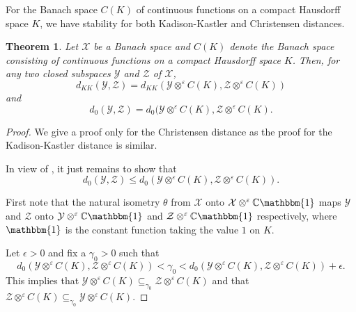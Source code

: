 \documentclass{amsart}
\numberwithin{equation}{section}
\newcommand{\mcal}{\mathcal}
\newcommand{\1}{\mathbf{1}}
\newtheorem{theorem}{Theorem}[section]
\begin{document}
For the Banach space $C(K)$ of continuous functions on a compact Hausdorff space
 $K$, we have stability for both Kadison-Kastler and Christensen distances.

\begin{theorem}\label{equality}
Let $\mcal{X}$ be a Banach space and $C(K)$ denote the Banach space
consisting of continuous functions on a compact Hausdorff space
$K$. Then, for any two closed subspaces $\mcal{Y}$ and $\mcal{Z}$ of
$\mcal{X}$,
\[
d_{KK}(\mcal{Y}, \mcal{Z})= d_{KK}(\mcal{Y}\otimes^{\varepsilon} C(K),
\mcal{Z}\otimes^{\varepsilon} C(K))
\]
and      
\[
 d_{0}(\mcal{Y}, \mcal{Z})= d_{0}(\mcal{Y}\otimes^{\varepsilon} C(K),
 \mcal{Z}\otimes^{\varepsilon} C(K).
\]

\end{theorem}


\begin{proof}
  We give a proof only for the Christensen distance as the proof for
  the Kadison-Kastler distance is similar.

  In view of , it just remains to show that
\[
d_{0}(\mcal{Y}, \mcal{Z})\leq d_{0}(\mcal{Y}\otimes^{\varepsilon} C(K), \mcal{Z}\otimes^{\varepsilon} C(K)). 
\]

First note that the natural isometry $\theta$ from $\mcal{X}$ onto
$\mcal{X}\otimes^{\varepsilon}\mathbb{C}\mathbbm{1}$ maps $\mcal{Y}$
and $\mcal{Z}$ onto
$\mcal{Y}\otimes^{\varepsilon}\mathbb{C}\mathbbm{1}$ and
$\mcal{Z}\otimes^{\varepsilon}\mathbb{C}\mathbbm{1}$ respectively,
where $\mathbbm{1}$ is the constant function taking the value $1$ on
$K$. 

Let $\epsilon>0$
and fix a $\gamma_{0}>0$ such that
\[
d_{0}(\mcal{Y} \otimes^{\varepsilon} C(K), \mcal{Z}\otimes^{\varepsilon} C(K))<  \gamma_{0} < d_{0}(\mcal{Y} \otimes^{\varepsilon} C(K), \mcal{Z}\otimes^{\varepsilon} C(K)) + \epsilon.
\]
This implies that $\mcal{Y} \otimes^{\varepsilon}
C(K)\subseteq_{\gamma_{0}}\mcal{Z}\otimes^{\varepsilon} C(K)$ and that
$\mcal{Z} \otimes^{\varepsilon}
C(K)\subseteq_{\gamma_{0}}\mcal{Y}\otimes^{\varepsilon} C(K)$.
 

\end{proof}
\end{document}
